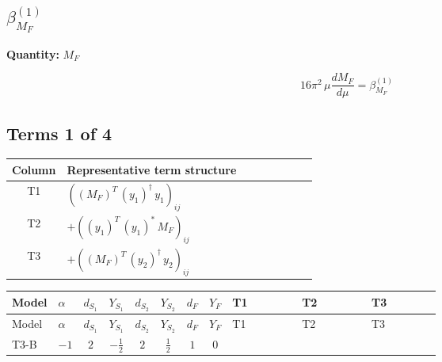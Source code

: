 \documentclass[8pt]{article}
\begin{document}
\begin{landscape}
\section*{$\beta_{M_F}^{(1)}$}
\noindent\textbf{Quantity: }$M_F$\par\smallskip
\[16\pi^2\,\mu\frac{d M_F}{d\mu}=\beta_{M_F}^{(1)}\]
\subsection*{Terms 1 of 4}
\begin{center}
\begin{tabular}{@{}c >{\raggedright\arraybackslash}p{0.82\linewidth}@{}}
\toprule
Column & Representative term structure \\
\midrule
T1 & \(\displaystyle \left(\left({M_F}\right)^{T}\,\left({y_1}\right)^{\dagger}\,{y_1}\right)_{ij}\) \\
\midrule
T2 & \(\displaystyle +\left(\left({y_1}\right)^{T}\,\left({y_1}\right)^{*}\,{M_F}\right)_{ij}\) \\
\midrule
T3 & \(\displaystyle +\left(\left({M_F}\right)^{T}\,\left({y_2}\right)^{\dagger}\,{y_2}\right)_{ij}\) \\
\midrule
\bottomrule
\end{tabular}
\end{center}
\smallskip
\tiny
\begin{longtable}{@{}llcccccc >{\raggedright\arraybackslash}p{0.21\linewidth} >{\raggedright\arraybackslash}p{0.21\linewidth} >{\raggedright\arraybackslash}p{0.21\linewidth}@{}}
\toprule
Model & $\alpha$ & $d_{S_1}$ & $Y_{S_1}$ & $d_{S_2}$ & $Y_{S_2}$ & $d_F$ & $Y_F$ & T1 & T2 & T3 \\
\midrule
\endfirsthead
\toprule
Model & $\alpha$ & $d_{S_1}$ & $Y_{S_1}$ & $d_{S_2}$ & $Y_{S_2}$ & $d_F$ & $Y_F$ & T1 & T2 & T3 \\
\midrule
\endhead
T3-B & $-1$ & $2$ & $-\frac{1}{2}$ & $2$ & $\frac{1}{2}$ & $1$ & $0$ & \scriptsize\adjustbox{max width=\linewidth}{$\begin{gathered} \left(\left({M_F}\right)^{T}\,\left({y_1}\right)^{\dagger}\,{y_1}\right)_{ij}\end{gathered}$} & \scriptsize\adjustbox{max width=\linewidth}{$\begin{gathered} +\left(\left({y_1}\right)^{T}\,\left({y_1}\right)^{*}\,{M_F}\right)_{ij}\end{gathered}$} & \scriptsize\adjustbox{max width=\linewidth}{$\begin{gathered} +\left(\left({M_F}\right)^{T}\,\left({y_2}\right)^{\dagger}\,{y_2}\right)_{ij}\end{gathered}$} \\

\end{longtable}
\end{landscape}
\end{document}
